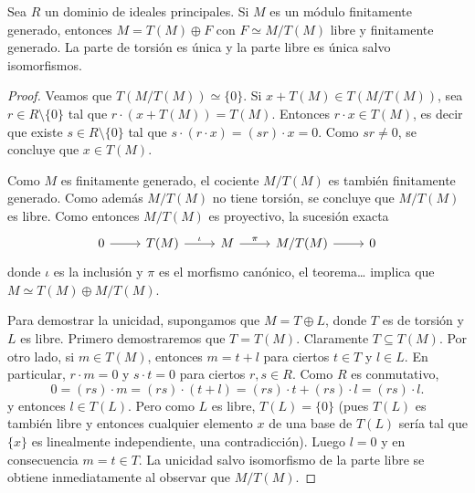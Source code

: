 \begin{theorem}
Sea $R$ un dominio de ideales principales. 
Si $M$ es un módulo finitamente generado, entonces $M=T(M)\oplus F$ con $F\simeq M/T(M)$ libre y finitamente generado. La
parte de torsión es única y la parte libre es única salvo isomorfismos.
\end{theorem}

\begin{proof}
	Veamos que $T(M/T(M))\simeq\{0\}$. Si $x+T(M)\in T(M/T(M))$, sea $r\in R\setminus\{0\}$ tal que
	$r\cdot (x+T(M))=T(M)$. Entonces $r\cdot x\in T(M)$, es decir que existe $s\in R\setminus\{0\}$ tal que $s\cdot (r\cdot x)=(sr)\cdot x=0$. 
	Como $sr\ne 0$, se concluye que $x\in T(M)$. 
	
	Como $M$ es finitamente generado, el cociente $M/T(M)$ es también finitamente generado. Como además $M/T(M)$ no tiene torsión, 
	se concluye que $M/T(M)$ es libre. 
	Como entonces $M/T(M)$ es proyectivo, la sucesión exacta 
\[
\begin{tikzcd}
	0 & T(M) & M & M/T(M) & 0
	\arrow[from=1-1, to=1-2]
	\arrow["\iota", from=1-2, to=1-3]
	\arrow["\pi", from=1-3, to=1-4]
	\arrow[from=1-4, to=1-5]
\end{tikzcd}\]
donde $\iota$ es la inclusión y $\pi$ es el morfismo canónico, 	el teorema\dots%
	 implica que $M\simeq T(M)\oplus M/T(M)$. 	
	 
	 Para demostrar la unicidad, supongamos que $M=T\oplus L$, donde $T$ es de torsión y $L$ es libre. Primero
	 demostraremos que $T=T(M)$. Claramente 
	 $T\subseteq T(M)$. Por otro lado, si $m\in T(M)$, entonces $m=t+l$ para ciertos $t\in T$ y $l\in L$. En particular, 
	 $r\cdot m=0$ y $s\cdot t=0$ para ciertos $r,s\in R$. Como $R$ es conmutativo, 
	 \[
	 0=(rs)\cdot m=(rs)\cdot (t+l)=(rs)\cdot t+(rs)\cdot l=(rs)\cdot l.
	 \]
	 y entonces $l\in T(L)$. Pero 
	 como $L$ es libre, $T(L)=\{0\}$ (pues $T(L)$ es también libre y entonces cualquier elemento $x$  
	 de una base de $T(L)$ sería tal que $\{x\}$ es linealmente independiente, una contradicción). Luego 
	 $l=0$ y en consecuencia $m=t\in T$. La unicidad salvo isomorfismo de la parte libre
	 se obtiene inmediatamente al observar que $M/T(M)$. 
\end{proof}



